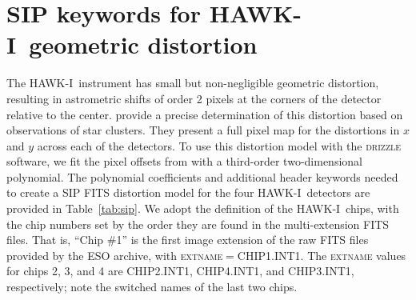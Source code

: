 \documentclass[preprint2]{aastex6}
\gdef\HAWKI{\mbox{HAWK-I}}
\begin{document}




%


\appendix

\label{appendix:sip}
\section{SIP keywords for \HAWKI\ geometric distortion}

The \HAWKI\ instrument has small but non-negligible geometric distortion, resulting in astrometric shifts of order 2 pixels at the corners of the detector relative to the center.  \cite{libralato:14} provide a precise determination of this distortion based on observations of star clusters.  They present a full pixel map for the distortions in $x$ and $y$ across each of the detectors.  To use this distortion model with the \textsc{drizzle} software, we fit the pixel offsets from \cite{libralato:14} with a third-order two-dimensional polynomial.  The polynomial coefficients and additional header keywords needed to create a SIP FITS distortion model \citep{fits:sip} for the four \HAWKI\ detectors are provided in Table~\ref{tab:sip}.  We adopt the \cite{libralato:14} definition of the \HAWKI\ chips, with the chip numbers set by the order they are found in the multi-extension FITS files.  That is, ``Chip \#1'' is the first image extension of the raw FITS files provided by the ESO archive, with \textsc{extname}$=$CHIP1.INT1.  The \textsc{extname} values for chips 2, 3, and 4 are CHIP2.INT1, CHIP4.INT1, and CHIP3.INT1, respectively; note the switched names of the last two chips.


\end{document}
